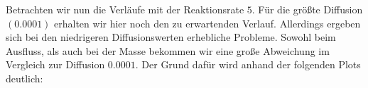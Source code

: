 \begin{figure}[H]
	\centering
\end{figure}

Betrachten wir nun die Verläufe mit der Reaktionsrate $5$. Für die größte Diffusion $(0.0001)$ erhalten wir hier noch den zu erwartenden Verlauf. Allerdings ergeben sich bei den niedrigeren Diffusionswerten erhebliche Probleme. Sowohl beim Ausfluss, als auch bei der Masse bekommen wir eine große Abweichung im Vergleich zur Diffusion $0.0001$. Der Grund dafür wird anhand der folgenden Plots deutlich:

